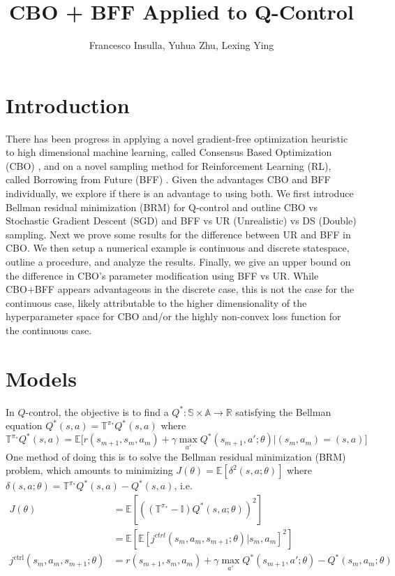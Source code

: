 \documentclass[10.5pt]{article}
\title{CBO + BFF Applied to Q-Control}
\author{Francesco Insulla, Yuhua Zhu, Lexing Ying}
\newcommand\bb{\mathbb}
\begin{document}
\maketitle

\section{Introduction}

There has been progress in applying a novel gradient-free optimization heuristic to high dimensional machine learning, called Consensus Based Optimization (CBO) \cite{carrillo2020consensusbased}, and on a novel sampling method for Reinforcement Learning (RL), called Borrowing from Future (BFF) \cite{zhu2020borrowing}. Given the advantages CBO and BFF individually, we explore if there is an advantage to using both. We first introduce Bellman residual minimization (BRM) for Q-control and outline CBO vs Stochastic Gradient Descent (SGD) and BFF vs UR (Unrealistic) vs DS (Double) sampling. Next we prove some results for the difference between UR and BFF in CBO. We then setup a numerical example is continuous and discrete statespace, outline a procedure, and analyze the results. Finally, we give an upper bound on the difference in CBO's parameter modification using BFF vs UR. While CBO+BFF appears advantageous in the discrete case, this is not the case for the continuous case, likely attributable to the higher dimensionality of the hyperparameter space for CBO and/or the highly non-convex loss function for the continuous case.

\section{Models}

In $Q$-control, the objective is to find a $Q^*:\bb S\times \bb A\to \bb R$ satisfying the Bellman equation $Q^*(s,a)=\bb T^{\pi_*} Q^*(s,a)$ where
$$
\bb T^{\pi_*} Q^*(s,a) = \bb E\Big[r(s_{m+1},s_m, a_m)+\gamma \max_{a'}Q^*(s_{m+1},a';\theta)\Big|(s_m, a_m)=(s,a)\Big]
$$
One method of doing this is to solve the Bellman residual minimization (BRM) problem, which amounts to minimizing $J(\theta)=\bb E[\delta^2(s,a;\theta)]$ where $\delta(s,a;\theta) = \bb T^{\pi_*}Q^*(s,a) -Q^*(s,a)$, i.e.
\begin{align*}
    J(\theta) &= \mathbb E[((\mathbb T^{\pi_*}-\mathbb I) Q^*(s,a;\theta))^2]\\
&= \mathbb E[\mathbb E[j^{ctrl}(s_m, a_m, s_{m+1};\theta)|s_m,a_m]^2]\\
j^{\text{ctrl}}(s_m, a_m, s_{m+1};\theta) &= r(s_{m+1}, s_m, a_m)  + \gamma \max_{a'} Q^*(s_{m+1},a';\theta) - Q^*(s_m,a_m;\theta)
\end{align*}
\end{document}
